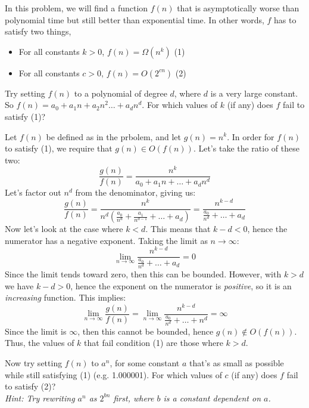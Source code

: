 \documentclass[11pt]{article}
\begin{document}
\pagebreak
{}

In this problem, we will find a function $f(n)$ that is asymptotically worse than polynomial time but still better than exponential time. In other words, $f$ has to satisfy two things, 
\begin{itemize}
\item For all constants $k > 0$, $f(n) = \Omega(n^k)$ \hfill (1) 
\item For all constants $c > 0$, $f(n) = O(2^{cn})$   \hfill (2)
\end{itemize}

\begin{subparts}
    \subpart Try setting $f(n)$ to a polynomial of degree $d$, where $d$ is a very large constant. So $f(n) = a_0 + a_1n + a_2n^2 \dots + a_dn^d$. For which values of $k$ (if any) does $f$ fail to satisfy (1)?

	\begin{solution}
		Let $f(n)$ be defined as in the prbolem, and let $g(n) = n^k$. In order for $f(n)$ to satisfy (1), we 
		require that $g(n) \in O(f(n))$. Let's take the ratio of these two:
		\[
			\frac{g(n)}{f(n)} = \frac{n^k}{a_0 + a_1n + \dots + a_dn^d}
		\] 
		Let's factor out $n^d$ from the denominator, giving us:
		\[
			\frac{g(n)}{f(n)} = \frac{n^k}{n^d\left( \frac{a_0}{n^d} + \frac{a_1}{n^{d - 1}} + \dots + 
			a_d\right) } = \frac{n^{k-d}}{\frac{a_0}{n^d} + \dots + a_d}
		\] 
		Now let's look at the case where $k < d$. This means that $k - d < 0$, hence
		the numerator has a negative exponent. Taking the limit as $n \to \infty$:
		\[
			\lim_{n \to \infty} \frac{n^{k-d}}{\frac{a_0}{n^d} + \dots + a_d} = 0
		\] 
		Since the limit tends toward zero, then this can be bounded. However, with $k > d$ we have 
		$k-d>0$, hence the exponent on the numerator is \textit{positive}, so it is an \textit{increasing} 
		function. This implies: 
		\[
			\lim_{n \to \infty} \frac{g(n)}{f(n)} = \lim_{n \to \infty} \frac{n^{k-d}}{\frac{a_0}{n^d} + \dots + n^d} = \infty 
		\] 
		Since the limit is $\infty$, then this cannot be bounded, hence $g(n) \not \in O(f(n))$. Thus, 
		the values of $k$ that fail condition (1) are those where $k > d$. 
	\end{solution}

    \subpart Now try setting $f(n)$ to $a^n$, for some constant $a$ that's as small as possible while still satisfying (1) (e.g. 1.000001). For which values of $c$ (if any) does $f$ fail to satisfy (2)? \\ \textit{Hint: Try rewriting $a^n$ as $2^{bn}$ first, where $b$ is a constant dependent on $a$.}


\end{subparts}
\end{document}
